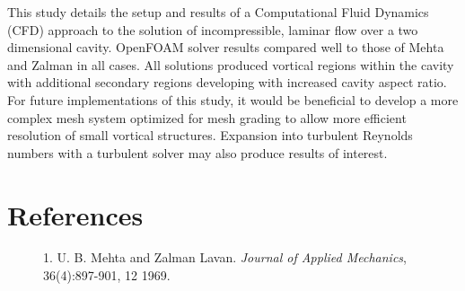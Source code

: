 \documentclass[twocolumn,10pt]{asme2ej}
\begin{document}
This study details the setup and results of a Computational Fluid Dynamics (CFD) approach to the solution of incompressible, laminar flow over a two dimensional cavity. OpenFOAM solver results compared well to those of Mehta and Zalman in all cases.  All solutions produced vortical regions within the cavity with additional secondary regions developing with increased cavity aspect ratio.  For future implementations of this study, it would be beneficial to develop a more complex mesh system optimized for mesh grading to allow more efficient resolution of small vortical structures.  Expansion into turbulent Reynolds numbers with a turbulent solver may also produce results of interest.

\section{References}
\begin{description}
\item[] 1. U. B. Mehta and Zalman Lavan. \emph{Journal of Applied Mechanics}, 36(4):897-901, 12 1969.
\end{description}

%

%

%

\end{document}

